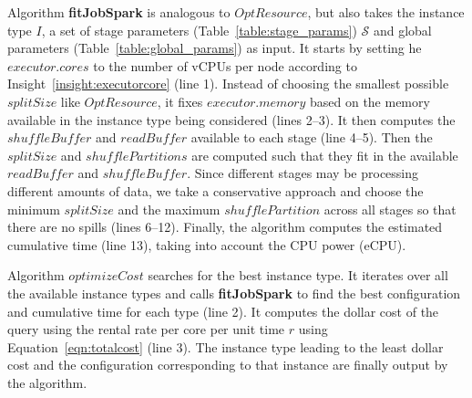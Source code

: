 Algorithm \textbf{fitJobSpark} is analogous to $OptResource$, but also takes the instance type $I$, a set of stage parameters (Table~\ref{table:stage_params}) $\mathcal{S}$ and global parameters (Table~\ref{table:global_params}) as input. It starts by setting  he $executor.cores$ to the number of vCPUs per node according to Insight~\ref{insight:executorcore} (line 1). Instead of choosing the smallest possible $splitSize$ like $OptResource$, it fixes $executor.memory$ based on the memory available in the instance type being considered (lines 2--3). It then computes the $shuffleBuffer$ and $readBuffer$ available to each stage (line 4--5). Then the $splitSize$ and $shufflePartitions$ are computed such that they fit in the available $readBuffer$ and $shuffleBuffer$. Since different stages may be processing different amounts of data, we take a conservative approach and choose the minimum $splitSize$ and the maximum $shufflePartition$ across all stages so that there are no spills (lines 6--12). Finally, the algorithm computes the estimated cumulative time (line 13), taking into account the CPU power (eCPU).


Algorithm $optimizeCost$ searches for the best instance type. It iterates over all the available instance types and calls \textbf{fitJobSpark} to find the best configuration and cumulative time for each type (line 2). It computes the dollar cost  of the query using the rental rate per core per unit time $r$ using Equation~\ref{eqn:totalcost} (line 3). The instance type leading to the least dollar cost and the configuration corresponding to that instance are finally output by the algorithm.

